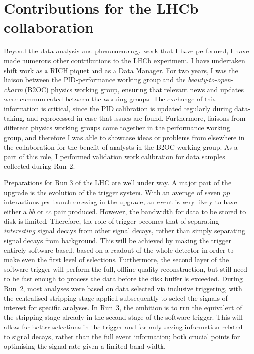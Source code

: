 \chapter{Contributions for the LHCb collaboration} %
\label{cha:contribution_for_the_lhcb_collaboration}

Beyond the data analysis and phenomenology work that I have performed, I have made numerous other contributions to the LHCb experiment. I have undertaken shift work as a RICH piquet and as a Data Manager. For two years, I was the liaison between the PID-performance working group and the \emph{beauty-to-open-charm} (B2OC) physics working group, ensuring that relevant news and updates were communicated between the working groups. The exchange of this information is critical, since the PID calibration is updated regularly during data-taking,  and reprocessed in case that issues are found. Furthermore, liaisons from different physics working groups come together in the performance working group, and therefore I was able to showcase ideas or problems from elsewhere in the collaboration for the benefit of analysts in the B2OC working group. As a part of this role, I performed validation work calibration for data samples collected during Run~2.  

Preparations for Run 3 of the LHC are well under way. A major part of the \lhcb upgrade is the evolution of the trigger system.  With an average of seven $pp$ interactions per bunch crossing in the upgrade, an event is very likely to have either a $b\bar b$ or $c\bar c$ pair produced. However, the bandwidth for data to be stored to disk is limited. Therefore, the role of trigger becomes that of separating \emph{interesting} signal decays from other signal decays, rather than simply separating signal decays from background. This will be achieved by making the trigger entirely software-based, based on a readout of the whole detector in order to make even the first level of selections.  Furthermore, the second layer of the software trigger will perform the full, offline-quality reconstruction, but still need to be fast enough to process the data before the disk buffer is exceeded. During Run~2, most analyses were based on data selected via inclusive triggering, with the centralised stripping stage applied subsequently to select the signals of interest for specific analyses. In Run~3, the ambition is to run the equivalent of the stripping stage already in the second stage of the software trigger. This will allow for better selections in the trigger and for only saving information related to signal decays, rather than the full event information; both crucial points for optimising the signal rate given a limited band width. 

